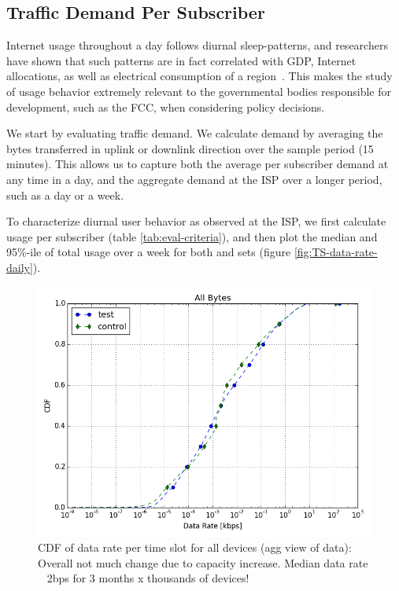 \subsection{Traffic Demand Per Subscriber}\label{subsec:behavior}

Internet usage throughout a day follows diurnal sleep-patterns, and researchers
have shown that such patterns are in fact correlated with GDP, Internet 
allocations, as well as electrical consumption of 
a region~\cite{ant-diurnal-web}. This makes the study of usage behavior 
extremely relevant to the governmental bodies responsible
for development, such as the FCC, when considering policy decisions.

We start by evaluating traffic demand. We calculate demand by averaging the 
bytes transferred in uplink or downlink direction over the sample period (15 
minutes). This allows us to capture both the average per subscriber demand at 
any time in a day, and the aggregate demand at the ISP over a longer period, 
such as a day or a week.

To characterize diurnal user behavior as observed at the ISP, we first calculate
usage per subscriber (table \ref{tab:eval-criteria}), and then plot the median 
and 95\%-ile of total usage over a week for both \treatment{} and \control{}
sets (figure \ref{fig:TS-data-rate-daily}).

\begin{figure}[ht]
\centering
\includegraphics[width=0.90\linewidth]{figures/cdf-all-bytes.png}
  \caption{CDF of data rate per time slot for all devices (agg view of data): 
Overall not much change due to capacity increase. Median data rate ~ 2bps for 3 
months x thousands of devices!}
  \label{fig:CDF-data-rate-all}
\end{figure}

